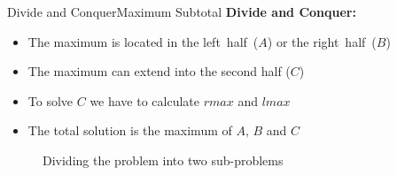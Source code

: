 \begin{frame}{Divide and Conquer}{Maximum Subtotal}
  \textbf{Divide and Conquer:}
  \begin{itemize}
    \item
      The maximum is located in the {\color{Mittel-Blau}left~half~($A$)}
      or the {\color{Mittel-Blau}right~half~($B$)}
    \item
      The maximum can {\color{Mittel-Blau}extend into the second half ($C$)}
    \item
      To solve $C$ we have to calculate $rmax$ and $lmax$
    \item
      The total solution is the {\color{Mittel-Blau}maximum of $A$, $B$ and $C$}
  \end{itemize}
  \begin{figure}
    \begin{adjustbox}{width=\linewidth}
      
    \end{adjustbox}
    \caption{Dividing the problem into two sub-problems}
    \label{fig:divide_and_conquer:max_sub_total_divide2}
  \end{figure}
\end{frame}


